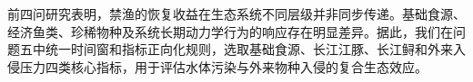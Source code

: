 前四问研究表明，禁渔的恢复收益在生态系统不同层级并非同步传递。基础食源、经济鱼类、珍稀物种及系统长期动力学行为的响应存在明显差异。据此，我们在问题五中统一时间窗和指标正向化规则，选取基础食源、长江江豚、长江鲟和外来入侵压力四类核心指标，用于评估水体污染与外来物种入侵的复合生态效应。